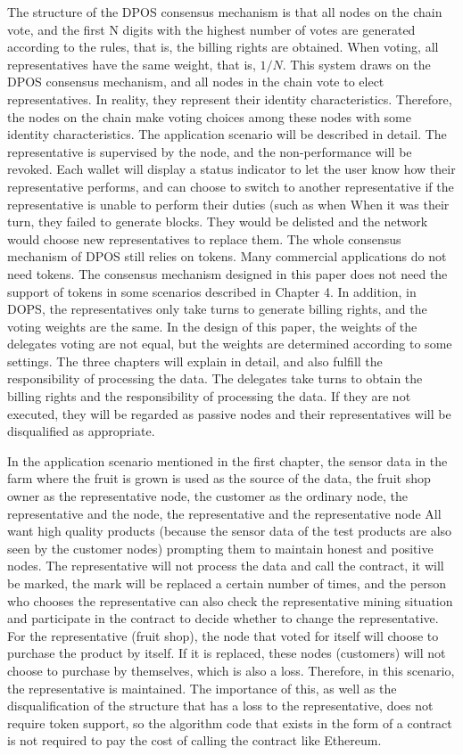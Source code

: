 \documentclass{ieeeaccess}
\begin{document}
The structure of the DPOS consensus mechanism is that all nodes on the chain vote, and the first N digits with the highest number of votes are generated according to the rules, that is, the billing rights are obtained. When voting, all representatives have the same weight, that is, $1/N$. This system draws on the DPOS consensus mechanism, and all nodes in the chain vote to elect representatives. In reality, they represent their identity characteristics. Therefore, the nodes on the chain make voting choices among these nodes with some identity characteristics. The application scenario will be described in detail. The representative is supervised by the node, and the non-performance will be revoked. Each wallet will display a status indicator to let the user know how their representative performs, and can choose to switch to another representative if the representative is unable to perform their duties (such as when When it was their turn, they failed to generate blocks. They would be delisted and the network would choose new representatives to replace them. The whole consensus mechanism of DPOS still relies on tokens. Many commercial applications do not need tokens. The consensus mechanism designed in this paper does not need the support of tokens in some scenarios described in Chapter 4. In addition, in DOPS, the representatives only take turns to generate billing rights, and the voting weights are the same. In the design of this paper, the weights of the delegates voting are not equal, but the weights are determined according to some settings. The three chapters will explain in detail, and also fulfill the responsibility of processing the data. The delegates take turns to obtain the billing rights and the responsibility of processing the data. If they are not executed, they will be regarded as passive nodes and their representatives will be disqualified as appropriate.

In the application scenario mentioned in the first chapter, the sensor data in the farm where the fruit is grown is used as the source of the data, the fruit shop owner as the representative node, the customer as the ordinary node, the representative and the node, the representative and the representative node All want high quality products (because the sensor data of the test products are also seen by the customer nodes) prompting them to maintain honest and positive nodes. The representative will not process the data and call the contract, it will be marked, the mark will be replaced a certain number of times, and the person who chooses the representative can also check the representative mining situation and participate in the contract to decide whether to change the representative. For the representative (fruit shop), the node that voted for itself will choose to purchase the product by itself. If it is replaced, these nodes (customers) will not choose to purchase by themselves, which is also a loss. Therefore, in this scenario, the representative is maintained. The importance of this, as well as the disqualification of the structure that has a loss to the representative, does not require token support, so the algorithm code that exists in the form of a contract is not required to pay the cost of calling the contract like Ethereum.
\end{document}
